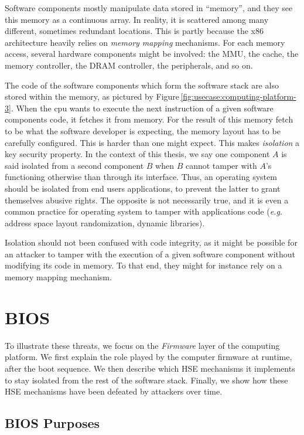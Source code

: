Software components mostly manipulate data stored in ``memory'', and they see
this memory as a continuous array.
%
In reality, it is scattered among many different, sometimes redundant locations.
%
This is partly because the x86 architecture heavily relies on \emph{memory
  mapping} mechanisms.
%
For each memory access, several hardware components might be involved: the MMU,
the cache, the memory controller, the DRAM controller, the peripherals, and so
on.

The code of the software components which form the software stack are also
stored within the memory, as pictured by
Figure\,\ref{fig:usecase:computing-platform-3}.
%
When the \ac{cpu} wants to execute the next instruction of a given software
components code, it fetches it from memory.
%
For the result of this memory fetch to be what the software developer is
expecting, the memory layout has to be carefully configured.
%
This is harder than one might expect.
%
This makes \emph{isolation} a key security property.
%
In the context of this thesis, we say one component $A$ is said isolated from a
second component $B$ when $B$ cannot tamper with $A$'s functioning otherwise
than through its interface.
%
Thus, an operating system should be isolated from end users applications, to
prevent the latter to grant themselves abusive rights.
%
The opposite is not necessarily true, and it is even a common practice for
operating system to tamper with applications code (\emph{e.g.} address space
layout randomization, dynamic libraries).

Isolation should not been confused with code integrity, as it might be possible
for an attacker to tamper with the execution of a given software component
without modifying its code in memory.
%
To that end, they might for instance rely on a memory mapping mechanism.


\section{BIOS}
\label{sec:usecase:firmware}

To illustrate these threats, we focus on the \emph{Firmware} layer of the
computing platform.
%
We first explain the role played by the computer firmware at runtime, after the
boot sequence.
%
We then describe which HSE mechanisms it implements to stay isolated from the
rest of the software stack.
%
Finally, we show how these HSE mechanisms have been defeated by attackers over
time.

\subsection{BIOS Purposes}

